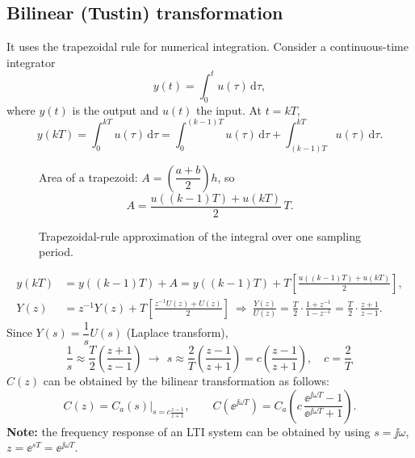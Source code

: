 \subsection{Bilinear (Tustin) transformation}
It uses the trapezoidal rule for numerical integration. Consider a continuous-time integrator
\[
  y(t)=\int_{0}^{t}u(\tau)\,\mathrm d\tau,
\]
where $y(t)$ is the output and $u(t)$ the input. At $t=kT$,
\[
  y(kT)=\int_{0}^{kT}u(\tau)\,\mathrm d\tau=\int_{0}^{(k-1)T}u(\tau)\,\mathrm d\tau+\int_{(k-1)T}^{kT}u(\tau)\,\mathrm d\tau.
\]
\begin{figure}[ht]
\centering
\begin{minipage}{0.58\linewidth}\resizebox{\linewidth}{!}{\figTrapezoid}\end{minipage}\hfill
\begin{minipage}{0.38\linewidth}
Area of a trapezoid: $A=\left(\dfrac{a+b}{2}\right)h$, so
\[
  A=\frac{u((k-1)T)+u(kT)}{2}\,T.
\]
\end{minipage}
\caption{Trapezoidal-rule approximation of the integral over one sampling period.}
\end{figure}
\begin{align*}
  y(kT)&=y((k-1)T)+A=y((k-1)T)+T\left[\frac{u((k-1)T)+u(kT)}{2}\right],\\
  Y(z)&=z^{-1}Y(z)+T\left[\frac{z^{-1}U(z)+U(z)}{2}\right]
  \ \Rightarrow\ \frac{Y(z)}{U(z)}=\frac T2\cdot\frac{1+z^{-1}}{1-z^{-1}}=\frac T2\cdot\frac{z+1}{z-1}.
\end{align*}
Since $Y(s)=\dfrac1sU(s)$ (Laplace transform),
\[
  \frac1s\approx\frac T2\left(\frac{z+1}{z-1}\right)\ \to\ \boxed{\,s\approx\frac2T\left(\frac{z-1}{z+1}\right)=c\left(\frac{z-1}{z+1}\right),\quad c=\frac2T\,}
\]
$C(z)$ can be obtained by the bilinear transformation as follows:
\[
  C(z)=C_a(s)\Big|_{s=c\frac{z-1}{z+1}},\qquad C(\ee^{\jj\omega T})=C_a\!\left(c\,\frac{\ee^{\jj\omega T}-1}{\ee^{\jj\omega T}+1}\right).
\]
\textbf{Note:} the frequency response of an LTI system can be obtained by using $s=\jj\omega$,
$z=\ee^{sT}=\ee^{\jj\omega T}$.

